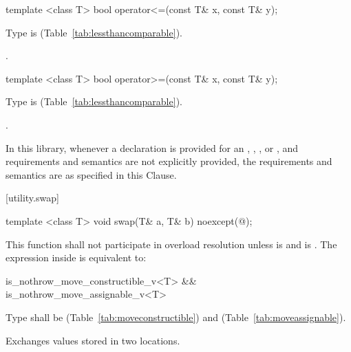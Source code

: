 %
\begin{itemdecl}
template <class T> bool operator<=(const T& x, const T& y);
\end{itemdecl}

\begin{itemdescr}
\pnum
\requires
Type  is  (Table~\ref{tab:lessthancomparable}).

\pnum
\returns
{}.
\end{itemdescr}

%
\begin{itemdecl}
template <class T> bool operator>=(const T& x, const T& y);
\end{itemdecl}

\begin{itemdescr}
\pnum
\requires
Type  is  (Table~\ref{tab:lessthancomparable}).

\pnum
\returns
{}.
\end{itemdescr}

\pnum
In this library, whenever a declaration is provided for an ,
, , or ,
and requirements and semantics are not explicitly provided,
the requirements and semantics are as specified in this Clause.

[utility.swap]{}

%
\begin{itemdecl}
template <class T>
  void swap(T& a, T& b) noexcept(@\seebelow@);
\end{itemdecl}

\begin{itemdescr}
\pnum
\remarks This function shall not participate in overload resolution
unless  is  and
 is .
The expression inside  is equivalent to:

\begin{codeblock}
is_nothrow_move_constructible_v<T> && is_nothrow_move_assignable_v<T>
\end{codeblock}

\pnum
\requires
Type
shall be
 (Table~\ref{tab:moveconstructible})
and
 (Table~\ref{tab:moveassignable}).

\pnum
\effects
Exchanges values stored in two locations.
\end{itemdescr}

